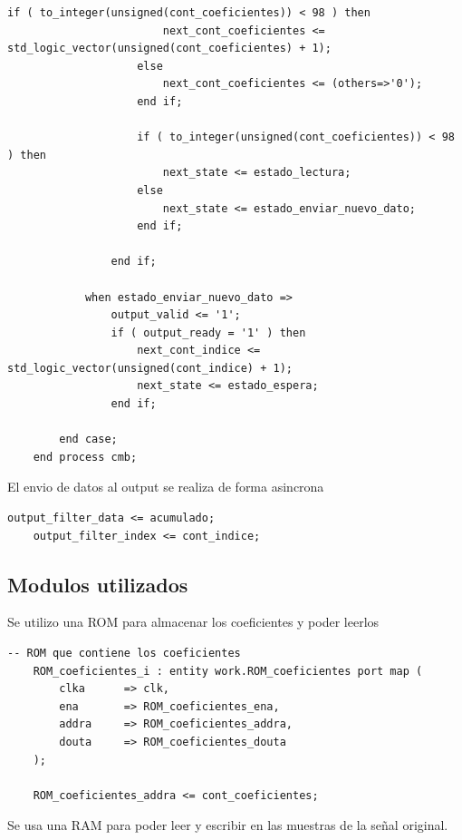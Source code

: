 \begin{lstlisting}[frame=single]
                    if ( to_integer(unsigned(cont_coeficientes)) < 98 ) then
                        next_cont_coeficientes <= std_logic_vector(unsigned(cont_coeficientes) + 1);                        
                    else
                        next_cont_coeficientes <= (others=>'0');
                    end if;                    
                    
                    if ( to_integer(unsigned(cont_coeficientes)) < 98 ) then
                        next_state <= estado_lectura;
                    else
                        next_state <= estado_enviar_nuevo_dato;
                    end if;
                    
                end if;
            
            when estado_enviar_nuevo_dato =>      
                output_valid <= '1';
                if ( output_ready = '1' ) then
                    next_cont_indice <= std_logic_vector(unsigned(cont_indice) + 1);
                    next_state <= estado_espera;
                end if;

        end case;
    end process cmb;
\end{lstlisting}

El envio de datos al output se realiza de forma asincrona
\lstset{language=VHDL, breaklines=true, basicstyle=\footnotesize}
\begin{lstlisting}[frame=single]
    output_filter_data <= acumulado;
    output_filter_index <= cont_indice;
\end{lstlisting}

\subsection{Modulos utilizados}
Se utilizo una ROM para almacenar los coeficientes y poder leerlos

\lstset{language=VHDL, breaklines=true, basicstyle=\footnotesize}
\begin{lstlisting}[frame=single]
    -- ROM que contiene los coeficientes 
    ROM_coeficientes_i : entity work.ROM_coeficientes port map (
        clka      => clk,
        ena       => ROM_coeficientes_ena,
        addra     => ROM_coeficientes_addra,
        douta     => ROM_coeficientes_douta
    );
    
    ROM_coeficientes_addra <= cont_coeficientes;
\end{lstlisting}

Se usa una RAM para poder leer y escribir en las muestras de la señal original.

